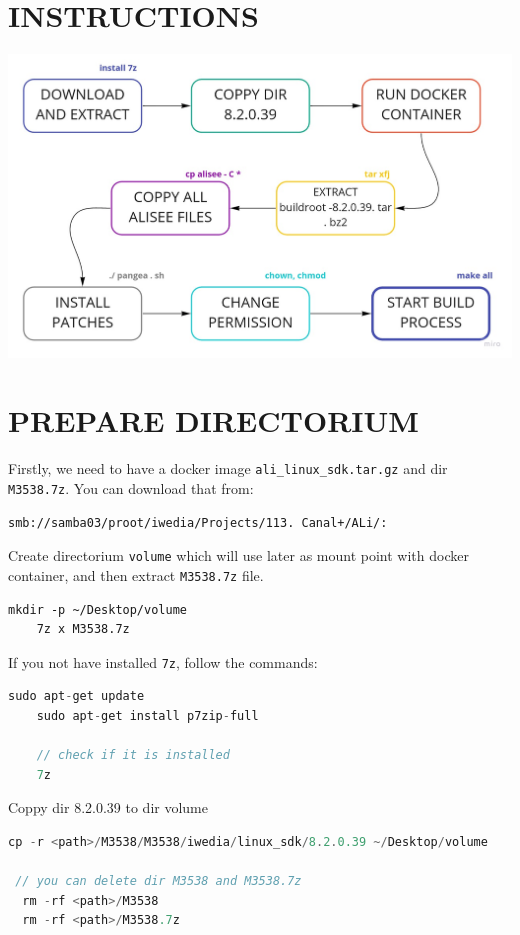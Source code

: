 \documentclass[12pt]{report}
\newcommand{\code}[1]{\texttt{#1}} %
\begin{document}
\newpage



\section{INSTRUCTIONS}
\begin{center}
    \includegraphics[scale=0.35]{make-buildroot.jpg}
\end{center}


\section{PREPARE DIRECTORIUM}
Firstly, we need to have a docker image \code{ali{\_}linux{\_}sdk.tar.gz} and dir \code{M3538.7z}.
You can download that from:
\begin{lstlisting}[caption= Download URL. ]
smb://samba03/proot/iwedia/Projects/113. Canal+/ALi/:
\end{lstlisting}

Create directorium \code{volume} which will use later as mount point with docker container,
and then extract \code{M3538.7z} file.
\begin{lstlisting}
mkdir -p ~/Desktop/volume
    7z x M3538.7z 
\end{lstlisting}

If you not have installed \code{7z}, follow the commands:
\begin{lstlisting}[language=C, caption= Install 7z. ]
    sudo apt-get update
    sudo apt-get install p7zip-full

    // check if it is installed 
    7z
\end{lstlisting}

Coppy dir 8.2.0.39 to dir volume

\begin{lstlisting}[language=C, caption= Coppy dir 8.2.0.39 ]
 cp -r <path>/M3538/M3538/iwedia/linux_sdk/8.2.0.39 ~/Desktop/volume

 // you can delete dir M3538 and M3538.7z
  rm -rf <path>/M3538
  rm -rf <path>/M3538.7z
\end{lstlisting}
\end{document}
